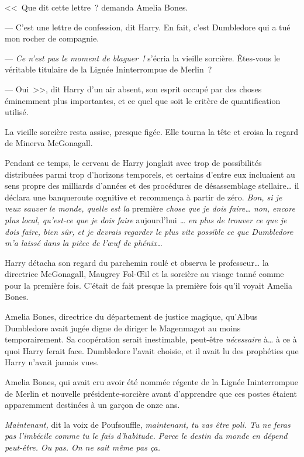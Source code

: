 <<~Que dit cette lettre~? demanda Amelia Bones.

--- C'est une lettre de confession, dit Harry. En fait, c'est Dumbledore qui a tué mon rocher de compagnie.

--- \emph{Ce n'est pas le moment de blaguer~!} s'écria la vieille sorcière. Êtes-vous le véritable titulaire de la Lignée Ininterrompue de Merlin~?

--- Oui~>>, dit Harry d'un air absent, son esprit occupé par des choses éminemment plus importantes, et ce quel que soit le critère de quantification utilisé.

La vieille sorcière resta assise, presque figée. Elle tourna la tête et croisa la regard de Minerva McGonagall.

Pendant ce temps, le cerveau de Harry jonglait avec trop de possibilités distribuées parmi trop d'horizons temporels, et certains d'entre eux incluaient au sens propre des milliards d'années et des procédures de désassemblage stellaire… il déclara une banqueroute cognitive et recommença à partir de zéro. \emph{Bon, si je veux sauver le monde, quelle est la} première \emph{chose que je dois faire… non, encore plus local, qu'est-ce que je dois faire} aujourd'hui \emph{… en plus de trouver ce que je dois faire, bien sûr, et je devrais regarder le plus vite possible ce que Dumbledore m'a laissé dans la pièce de l'œuf de phénix…}

Harry détacha son regard du parchemin roulé et observa le professeur… la directrice McGonagall, Maugrey Fol-Œil et la sorcière au visage tanné comme pour la première fois. C'était de fait presque la première fois qu'il voyait Amelia Bones.

Amelia Bones, directrice du département de justice magique, qu'Albus Dumbledore avait jugée digne de diriger le Magenmagot au moins temporairement. Sa coopération serait inestimable, peut-être \emph{nécessaire} à… à ce à quoi Harry ferait face. Dumbledore l'avait choisie, et il avait lu des prophéties que Harry n'avait jamais vues.

Amelia Bones, qui avait cru avoir été nommée régente de la Lignée Ininterrompue de Merlin et nouvelle présidente-sorcière avant d'apprendre que ces postes étaient apparemment destinées à un garçon de onze ans.

\emph{Maintenant,} dit la voix de Poufsouffle, \emph{maintenant, tu vas être poli. Tu ne feras pas l'imbécile comme tu le fais d'habitude. Parce le destin du monde en dépend peut-être. Ou pas. On ne sait même pas ça.}


